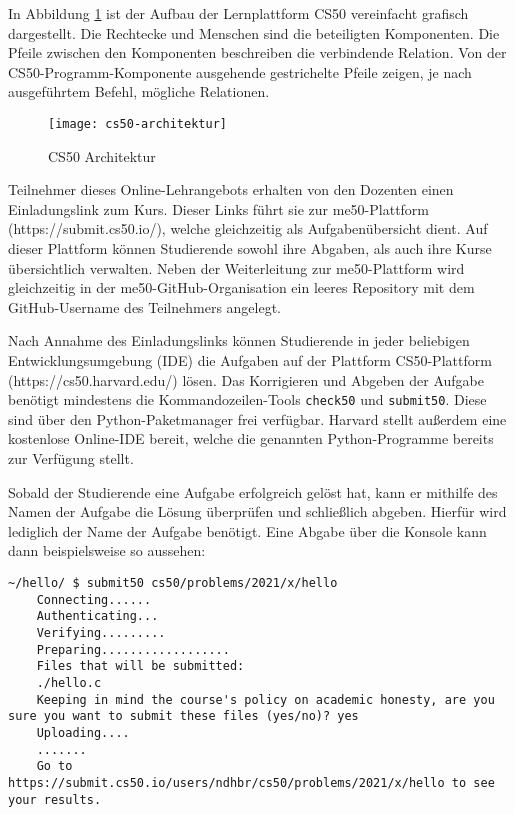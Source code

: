 In Abbildung \ref{fig:cs50-architektur} ist der Aufbau der Lernplattform CS50
vereinfacht grafisch dargestellt. Die Rechtecke und Menschen sind die
beteiligten Komponenten. Die Pfeile zwischen den Komponenten beschreiben die
verbindende Relation. Von der \glqq CS50-Programm\grqq-Komponente ausgehende gestrichelte Pfeile zeigen, je nach ausgeführtem Befehl, mögliche Relationen.

\begin{figure}[h]
    \centering
    \texttt{[image: cs50-architektur]}
    \caption{CS50 Architektur}
    \label{fig:cs50-architektur}
\end{figure}

Teilnehmer dieses Online-Lehrangebots erhalten von den Dozenten einen
Einladungslink zum Kurs. Dieser Links führt sie zur me50-Plattform
(https://submit.cs50.io/), welche gleichzeitig als Aufgabenübersicht dient.
Auf dieser Plattform können Studierende sowohl ihre Abgaben, als auch ihre Kurse
übersichtlich verwalten. Neben der Weiterleitung zur me50-Plattform wird
gleichzeitig in der me50-GitHub-Organisation ein leeres Repository mit dem
GitHub-Username des Teilnehmers angelegt.

Nach Annahme des Einladungslinks können Studierende in jeder beliebigen
Entwicklungsumgebung (IDE) die Aufgaben auf der Plattform CS50-Plattform
(https://cs50.harvard.edu/) lösen. Das Korrigieren und Abgeben der Aufgabe
benötigt mindestens die Kommandozeilen-Tools \texttt{check50} und
\texttt{submit50}. Diese sind über den Python-Paketmanager frei verfügbar.
Harvard stellt außerdem eine kostenlose Online-IDE bereit, welche die genannten
Python-Programme bereits zur Verfügung stellt.

Sobald der Studierende eine Aufgabe erfolgreich gelöst hat, kann er mithilfe des
Namen der Aufgabe die Lösung überprüfen und schließlich abgeben. Hierfür wird
lediglich der Name der Aufgabe benötigt. Eine Abgabe über die Konsole kann dann
beispielsweise so aussehen:

\begin{lstlisting}[style=Bash]
    ~/hello/ $ submit50 cs50/problems/2021/x/hello
    Connecting......
    Authenticating...
    Verifying.........
    Preparing..................
    Files that will be submitted:
    ./hello.c
    Keeping in mind the course's policy on academic honesty, are you sure you want to submit these files (yes/no)? yes
    Uploading....
    .......
    Go to https://submit.cs50.io/users/ndhbr/cs50/problems/2021/x/hello to see your results.
\end{lstlisting}

